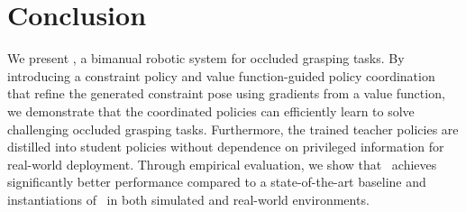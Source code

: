 \section{Conclusion} 
We present \ourmethod, a bimanual robotic system for occluded grasping tasks.
By introducing a constraint policy and value function-guided policy coordination that refine the generated constraint pose using gradients from a value function, we demonstrate that the coordinated policies can efficiently learn to solve challenging occluded grasping tasks.
Furthermore, the trained teacher policies are distilled into student policies without dependence on privileged information for real-world deployment.
Through empirical evaluation, we show that \ourmethod~achieves significantly better performance compared to a state-of-the-art baseline and instantiations of \ourmethod~in both simulated and real-world environments.
